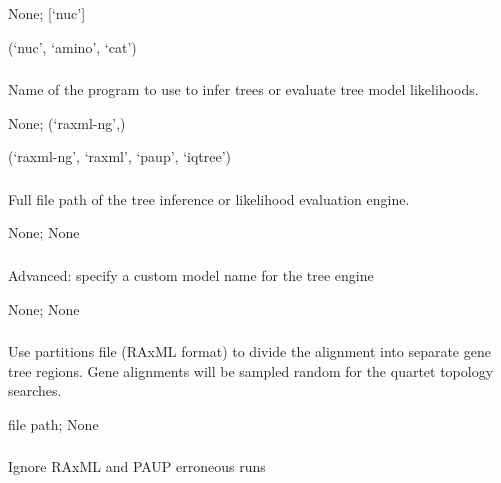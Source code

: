 \documentclass[letterpaper,12pt,english]{sphinxmanual}
\begin{document}
 None;  {[}‘nuc’{]}

 (‘nuc’, ‘amino’, ‘cat’)


\subsubsection{}
\label{\detokenize{prog_desc:engine}}
 Name of the program to use to infer trees or evaluate tree model likelihoods.

 None;  (‘raxml-ng’,)

 (‘raxml-ng’, ‘raxml’, ‘paup’, ‘iqtree’)


\subsubsection{}
\label{\detokenize{prog_desc:engine-exec}}
 Full file path of the tree inference or likelihood evaluation engine.

 None;  None


\subsubsection{}
\label{\detokenize{prog_desc:engine-model}}
 Advanced: specify a custom model name for the tree engine

 None;  None


\subsubsection{}
\label{\detokenize{prog_desc:genetrees}}
 Use partitions file (RAxML format) to divide the alignment into separate gene tree regions. Gene alignments will be sampled random for the quartet topology searches.

 file path;  None


\subsubsection{}
\label{\detokenize{prog_desc:ignore-errors}}
 Ignore RAxML and PAUP erroneous runs
\end{document}
